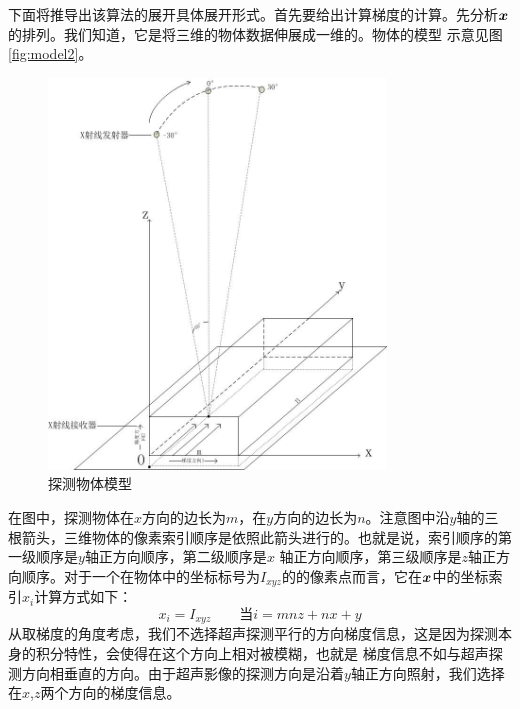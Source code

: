 下面将推导出该算法的展开具体展开形式。首先要给出计算梯度的计算。先分析$\bm{ x}$的排列。我们知道，它是将三维的物体数据伸展成一维的。物体的模型
示意见图\ref{fig:model2}。
\begin{figure}[ht]
\center
\includegraphics[width=0.8\textwidth]{figure/model2.jpg}
\caption{探测物体模型}\label{fig:modle2}
\end{figure}
在图中，探测物体在$x$方向的边长为$m$，在$y$方向的边长为$n$。注意图中沿$y$轴的三根箭头，三维物体的像素索引顺序是依照此箭头进行的。也就是说，索引顺序的第一级顺序是$y$轴正方向顺序，第二级顺序是$x$
轴正方向顺序，第三级顺序是$z$轴正方向顺序。对于一个在物体中的坐标标号为$I_{xyz}$的的像素点而言，它在$\bm{ x}$中的坐标索引$x_i$计算方式如下：
\begin{equation}\label{eq:indexconvert}
x_i = I_{xyz}\qquad \text{当} i = mnz+nx+y
\end{equation}
从取梯度的角度考虑，我们不选择超声探测平行的方向梯度信息，这是因为探测本身的积分特性，会使得在这个方向上相对被模糊，也就是
梯度信息不如与超声探测方向相垂直的方向。由于超声影像的探测方向是沿着$y$轴正方向照射，我们选择在$x$,$z$两个方向的梯度信息。

